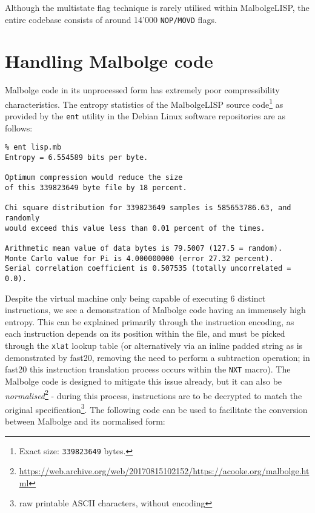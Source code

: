 \par Although the multistate flag technique is rarely utilised within MalbolgeLISP, the entire codebase consists of around 14'000 \verb|NOP/MOVD| flags.

\section{Handling Malbolge code}

\par Malbolge code in its unprocessed form has extremely poor compressibility characteristics. The entropy statistics of the MalbolgeLISP source code\footnote{Exact size: \verb|339823649| bytes.} as provided by the \verb|ent| utility in the Debian Linux software repositories are as follows:

\begin{verbatim}
% ent lisp.mb
Entropy = 6.554589 bits per byte.

Optimum compression would reduce the size
of this 339823649 byte file by 18 percent.

Chi square distribution for 339823649 samples is 585653786.63, and randomly
would exceed this value less than 0.01 percent of the times.

Arithmetic mean value of data bytes is 79.5007 (127.5 = random).
Monte Carlo value for Pi is 4.000000000 (error 27.32 percent).
Serial correlation coefficient is 0.507535 (totally uncorrelated = 0.0).
\end{verbatim}

\par Despite the virtual machine only being capable of executing 6 distinct instructions, we see a demonstration of Malbolge code having an immensely high entropy. This can be explained primarily through the instruction encoding, as each instruction depends on its position within the file, and must be picked through the \verb|xlat| lookup table (or alternatively via an inline padded string as is demonstrated by fast20, removing the need to perform a subtraction operation; in fast20 this instruction translation process occurs within the \verb|NXT| macro). The Malbolge code is designed to mitigate this issue already, but it can also be \textit{normalised}\footnote{\url{https://web.archive.org/web/20170815102152/https://acooke.org/malbolge.html}} - during this process, instructions are to be decrypted to match the original specification\footnote{raw printable ASCII characters, without encoding}. The following code can be used to facilitate the conversion between Malbolge and its normalised form:

